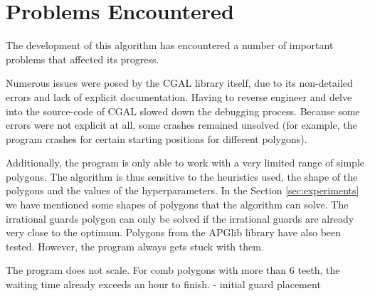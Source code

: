 \section{Problems Encountered}
The development of this algorithm has encountered a number of important problems that affected its progress.

Numerous issues were posed by the CGAL library itself, due to its non-detailed errors and lack of explicit documentation. Having to reverse engineer and delve into the source-code of CGAL slowed down the debugging process. Because some errors were not explicit at all, some crashes remained unsolved (for example, the program crashes for certain starting positions for different polygons).

Additionally, the program is only able to work with a very limited range of simple polygons. The algorithm is thus sensitive to the heuristics used, the shape of the polygons and the values of the hyperparameters. In the Section \ref{sec:experiments} we have mentioned some shapes of polygons that the algorithm can solve. 
The irrational guards polygon can only be solved if the irrational guards are already very close to the optimum. Polygons from the APGlib library \cite{art-gallery-instances-page} have also been tested. However, the program always gets stuck with them.

The program does not scale. For comb polygons with more than 6 teeth, the waiting time already exceeds an hour to finish.
- initial guard placement
